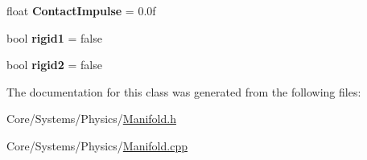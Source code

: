 \begin{DoxyCompactItemize}
\item 
\hypertarget{classDCEngine_1_1Manifold_a33c5d40fc6cfca38c3188a73b08bd50b}{float {\bfseries Contact\-Impulse} = 0.\-0f}\label{classDCEngine_1_1Manifold_a33c5d40fc6cfca38c3188a73b08bd50b}

\item 
\hypertarget{classDCEngine_1_1Manifold_ae072c3e5ca34c21f201a4c4bed353b48}{bool {\bfseries rigid1} = false}\label{classDCEngine_1_1Manifold_ae072c3e5ca34c21f201a4c4bed353b48}

\item 
\hypertarget{classDCEngine_1_1Manifold_a3b971d7f677e2f5bf39cac6d32df794f}{bool {\bfseries rigid2} = false}\label{classDCEngine_1_1Manifold_a3b971d7f677e2f5bf39cac6d32df794f}

\end{DoxyCompactItemize}


The documentation for this class was generated from the following files\-:\begin{DoxyCompactItemize}
\item 
Core/\-Systems/\-Physics/\hyperlink{Manifold_8h}{Manifold.\-h}\item 
Core/\-Systems/\-Physics/\hyperlink{Manifold_8cpp}{Manifold.\-cpp}\end{DoxyCompactItemize}
